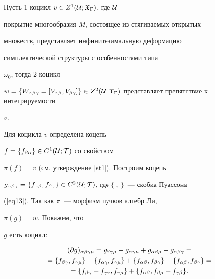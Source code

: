 \begin{pf}


Пусть 1-коцикл $v \in Z^1({\cal U}; {\frak X}_\Gamma)$, где ${\cal U}$~---


покрытие многообразия $M$, состоящее из стягиваемых открытых


множеств, представляет инфинитезимальную деформацию


симплектической структуры с особенностями типа


$\omega_0$, тогда 2-коцикл


$w=\{W_{\alpha\beta\gamma} = [V_{\alpha\beta}, V_{\beta\gamma}]\}


\in Z^2(\cU; \gX_\Gamma)$ представляет препятствие к интегрируемости


$v$.





Для коцикла $v$ определена коцепь


$f = \{f_{\beta\alpha}\} \in C^1({\cal U}; {\cal T})$ со свойством


$\pi(f) = v$ (см. утверждение \ref{st1}). Построим коцепь


$g_{\alpha\beta\gamma} =\{f_{\alpha\beta},f_{\beta\gamma}\}


\in C^2(\cU; \cT)$, где $\{\ ,\ \}$~--- скобка Пуассона


(\ref{eq13}). Так как $\pi$~--- морфизм пучков алгебр Ли,


$\pi(g)=w$. Покажем, что


$g$ есть коцикл:


\begin{multline}\label{eq14}


(\pd g)_{\alpha\beta\gamma\mu} = g_{\beta\gamma\mu} -


g_{\alpha\gamma\mu} + g_{\alpha\beta\mu} -


g_{\alpha\beta\gamma}=\\


%


=\{f_{\beta\gamma},f_{\gamma\mu}\} -


\{f_{\alpha\gamma}, f_{\gamma\mu}\} +


\{f_{\alpha\beta},f_{\beta\gamma}\} - \{f_{\alpha\beta},


f_{\beta\gamma}\}=\\


%


=\{f_{\beta\gamma} + f_{\gamma\alpha}, f_{\gamma\mu}\}+


\{f_{\alpha\beta}, f_{\beta\mu}+ f_{\gamma\beta}\}.



\end{multline}
\end{pf}
